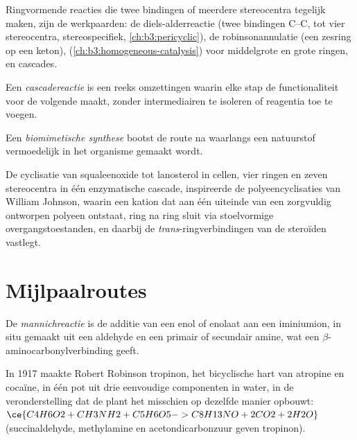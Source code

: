 Ringvormende reacties die twee bindingen of meerdere stereocentra
tegelijk maken, zijn de werkpaarden: de diels-alderreactie (twee
bindingen C--C, tot vier stereocentra, stereospecifiek,
\cref{ch:b3:pericyclic}), de robinsonannulatie (een zesring op een
keton), 
(\cref{ch:b3:homogeneous-catalysis}) voor middelgrote en grote ringen, en
cascades.

\begin{definition}[Cascadereactie]\label{def:b3:total-synthesis:cascade}
Een \emph{cascadereactie} is een reeks omzettingen
waarin elke stap de functionaliteit voor de volgende maakt, zonder
intermediairen te isoleren of reagentia toe te voegen.
\end{definition}

\begin{definition}\label{def:b3:total-synthesis:biomimetic}
Een \emph{biomimetische synthese} bootst de
route na waarlangs een natuurstof vermoedelijk in het organisme gemaakt
wordt.
\end{definition}

De cyclisatie van squaleenoxide tot lanosterol in cellen, vier ringen en
zeven stereocentra in één enzymatische cascade, inspireerde de
polyeencyclisaties van William Johnson, waarin een kation dat aan één
uiteinde van een zorgvuldig ontworpen polyeen ontstaat, ring na ring
sluit via stoelvormige overgangstoestanden, en daarbij de
\textit{trans}-ringverbindingen van de steroïden vastlegt.

\section{Mijlpaalroutes}

\begin{definition}[Mannichreactie]\label{def:b3:total-synthesis:mannich}
De \emph{mannichreactie} is de additie van een enol
of enolaat aan een iminiumion, in situ gemaakt uit een aldehyde en een
primair of secundair amine, wat een $\beta$-aminocarbonylverbinding geeft.
\end{definition}

In 1917 maakte Robert Robinson tropinon, het bicyclische hart van
atropine en cocaïne, in één pot uit drie eenvoudige componenten in water,
in de veronderstelling dat de plant het misschien op dezelfde manier
opbouwt:
$\ce{C4H6O2 + CH3NH2 + C5H6O5 -> C8H13NO + 2CO2 + 2H2O}$ (succinaldehyde, methylamine en
acetondicarbonzuur geven tropinon).

